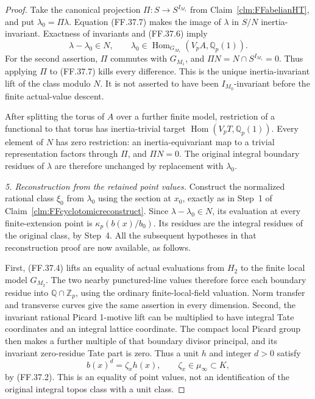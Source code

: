 \begin{proof}
Take the canonical projection
\(\Pi:S\to S^{I_{M_1}}\) from
Claim~\ref{clm:FFabelianHT}, and put
\(\lambda_0=\Pi\lambda\).
Equation (FF.37.7) makes the image
of \(\lambda\) in \(S/N\)
inertia-invariant. Exactness of
invariants and (FF.37.6) imply
\[
               \lambda-\lambda_0\in N,
           \qquad \lambda_0\in
             \operatorname{Hom}_{G_{M_1}}(V_pA,\mathbb Q_p(1)).
                                                        \tag{FF.37.8}
\]
For the second assertion, \(\Pi\)
commutes with \(G_{M_1}\), and
\(\Pi N=N\cap S^{I_{M_1}}=0\).
Thus applying \(\Pi\) to
(FF.37.7) kills every difference.
This is the unique inertia-invariant
lift of the class modulo \(N\).
It is not asserted to have been
\(I_{M_0}\)-invariant before the
finite actual-value descent.

After splitting the torus of \(A\)
over a further finite model, restriction
of a functional to that torus has
inertia-trivial target
\(\operatorname{Hom}(V_pT,\mathbb Q_p(1))\).
Every element of \(N\) has zero
restriction: an inertia-equivariant
map to a trivial representation
factors through \(\Pi\), and
\(\Pi N=0\). The original integral
boundary residues of \(\lambda\)
are therefore unchanged by replacement
with \(\lambda_0\).

\emph{5. Reconstruction from the retained point values.}
Construct the normalized rational
class \(\xi_0\) from \(\lambda_0\)
using the section at \(x_0\),
exactly as in Step~1 of
Claim~\ref{clm:FFcyclotomicreconstruct}.
Since \(\lambda-\lambda_0\in N\),
its evaluation at every finite-extension
point is \(\kappa_p(b(x)/b_0)\).
Its residues are the integral residues
of the original class, by Step~4.
All the subsequent hypotheses in
that reconstruction proof are now
available, as follows.

First, (FF.37.4) lifts an equality
of actual evaluations from \(H_2\)
to the finite local model \(G_{M_2}\).
The two nearby punctured-line values
therefore force each boundary residue
into \(\mathbb Q\cap\mathbb Z_p\),
using the ordinary finite-local-field
valuation. Norm transfer and transverse
curves give the same assertion in
every dimension. Second, the invariant
rational Picard 1-motive lift can
be multiplied to have integral Tate
coordinates and an integral lattice
coordinate. The compact local Picard
group then makes a further multiple
of that boundary divisor principal,
and its invariant zero-residue Tate
part is zero. Thus a unit \(h\)
and integer \(d>0\) satisfy
\[
                    b(x)^d=\zeta_xh(x),
                         \qquad\zeta_x\in\mu_\infty\subset K,
                                                        \tag{FF.37.9}
\]
by (FF.37.2). This is an equality
of point values, not an identification
of the original integral topos class
with a unit class.


\end{proof}
